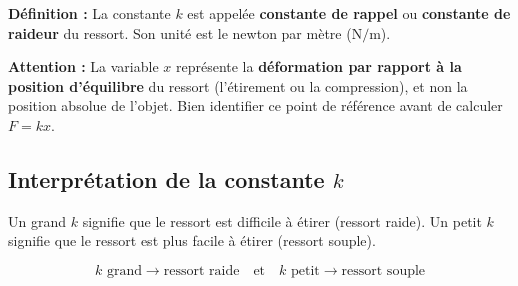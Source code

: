 \documentclass[11pt,openany]{book}
\begin{document}
\begin{center}
\end{center}

\textbf{Définition :} La constante $k$ est appelée \textbf{constante de rappel} ou \textbf{constante de raideur} du ressort. Son unité est le newton par mètre ($\mathrm{N/m}$).

\vspace{0.3cm}

\noindent\textbf{Attention :} La variable $x$ représente la \textbf{déformation par rapport à la position d'équilibre} du ressort (l'étirement ou la compression), et non la position absolue de l'objet. Bien identifier ce point de référence avant de calculer $F = kx$.

\subsection{Interprétation de la constante $k$}

Un grand $k$ signifie que le ressort est difficile à étirer (ressort raide). Un petit $k$ signifie que le ressort est plus facile à étirer (ressort souple).

\[
\boxed{k \text{ grand} \rightarrow \text{ressort raide}}
\quad \text{et} \quad
\boxed{k \text{ petit} \rightarrow \text{ressort souple}}
\]
\end{document}
